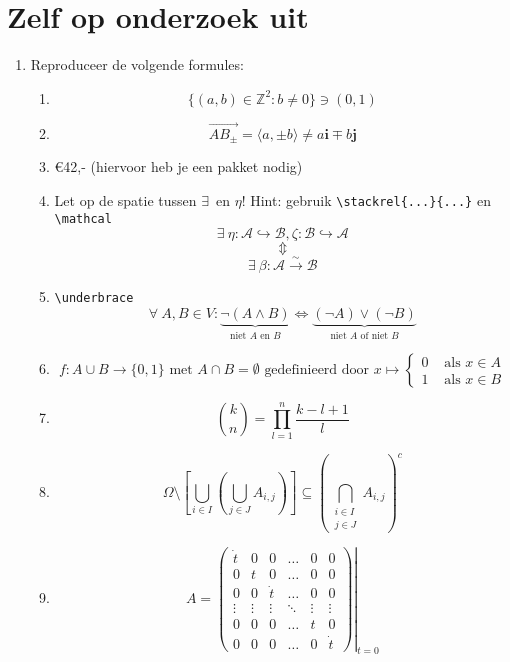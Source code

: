 \documentclass{article}
\begin{document}
\section{Zelf op onderzoek uit}
\begin{enumerate}
	\item Reproduceer de volgende formules:
	\begin{enumerate}
		\item \[  \{(a,b) \in \mathbb{Z}^2 : b \neq 0\} \ni (0,1) \]
		\item \[\overrightarrow{AB_{\pm}} = \langle a, \pm b \rangle \neq a\mathbf{i} \mp b\mathbf{j}\]
		\item \euro 42,- (hiervoor heb je een pakket nodig)
		\item Let op de spatie tussen \textquotesingle\(\exists\)\textquotesingle \ en \textquotesingle\(\eta\)\textquotesingle! Hint: gebruik \verb|\stackrel{...}{...}| en \verb.\mathcal.
			\[\exists \ \eta :\mathcal{A} \hookrightarrow \mathcal{B}, \zeta : \mathcal{B} \hookrightarrow \mathcal{A}\]
			\[\Updownarrow\]
			\[\exists \ \beta : \mathcal{A} \stackrel{\sim}{\longrightarrow} \mathcal{B}\]
		\item \verb+\underbrace+
			\[\forall \ A, B \in V :  \underbrace{\neg(A \wedge B)}_{\text{niet } A \text{ en } B} \Longleftrightarrow \underbrace{(\neg A) \vee (\neg B)}_{\text{niet } A \text{ of niet } B}\]
		\item 			\[f : A \cup B \to \{0,1\} \text{ met } A \cap B = \emptyset \text{ gedefinieerd door } x \mapsto \begin{cases} 0 & \text{ als } x \in A\\1 & \text{ als } x \in B \end{cases}\]
		\item 
			\[\binom{k}{n} = \prod_{l = 1}^n\frac{k-l+1}{l}\]
		\item	
			\[\Omega \setminus \left[\bigcup_{i \in I}\left(\bigcup_{j \in J} A_{i,j} \right)\right] \subseteq \left(\bigcap_{\begin{smallmatrix} i \in I \\ j \in J \end{smallmatrix}} A_{i,j}\right)^c\]
		\item
			\[A = \left.\left(
			\begin{array}{cccccc}
				\dot{t} 	& 0 		& 0		& \ldots 	& 0 		& 0\\
				0 		& t 		& 0		& \ldots 	& 0 		& 0\\
				0 		& 0 		& \dot{t} & \ldots 	& 0 		& 0\\
				\vdots 	& \vdots 	& \vdots 	& \ddots 	& \vdots 	& \vdots \\
				0 		& 0 		& 0 		& \ldots 	& t 		& 0\\
				0 		& 0 		& 0 		& \ldots 	& 0 		& \dot{t}
			\end{array}\right)\right|_{t = 0}\]
	\end{enumerate}
\end{enumerate}
\end{document}
